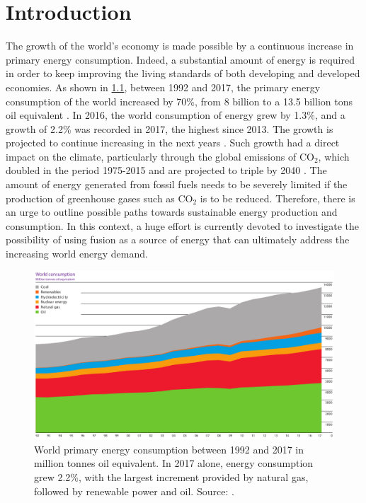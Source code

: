 \chapter{Introduction}
\label{introduction}



The growth of the world's economy is made possible by a continuous increase in primary energy consumption.
%
Indeed, a substantial amount of energy is required in order to keep improving the living standards of both developing and developed economies.
%
As shown in \cref{fig:worldconsumption}, between 1992 and 2017, the primary energy consumption of the world increased by 70\%, from 8 billion to a 13.5 billion tons oil equivalent \citep{Chen2017}.
%
In 2016, the world consumption of energy grew by 1.3\%, and a growth of 2.2\% was recorded in 2017, the highest since 2013.
%
The growth is projected to continue increasing in the next years \citep{BP2017}.
%
Such growth had a direct impact on the climate, particularly through the global emissions of CO$_2$, which doubled in the period 1975-2015 and are projected to triple by 2040 \citep{Chu2017}.
%
The amount of energy generated from fossil fuels needs to be severely limited if the production of greenhouse gases such as CO$_2$ is to be reduced.
%
Therefore, there is an urge to outline possible paths towards sustainable energy production and consumption.
%
In this context, a huge effort is currently devoted to investigate the possibility of using fusion as a source of energy that can ultimately address the increasing world energy demand.

\begin{figure}
    \centering
    \includegraphics[width=.85\textwidth]{images/2017_world_consumption.pdf}
    \caption{World primary energy consumption between 1992 and 2017 in million tonnes oil equivalent. In 2017 alone, energy consumption grew 2.2\%, with the largest increment provided by natural gas, followed by renewable power and oil. Source: \citet{BP2017}.}
    \label{fig:worldconsumption}
\end{figure}

